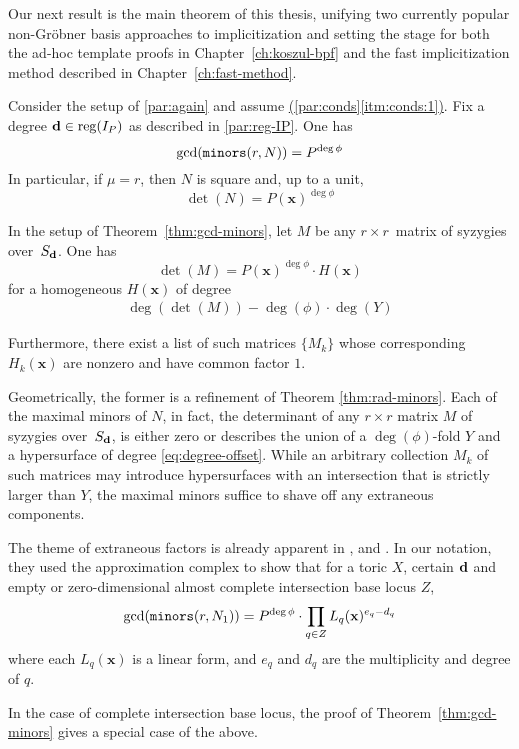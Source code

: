 \documentclass[fleqn,reqno]{amsart}
\renewcommand{\itmref}[2]{{\normalfont\hyperref[#1]{(\ref*{#2}\ref*{#1})}}}
\begin{document}
\begin{paragraf*}
Our next result is the main theorem of this thesis, unifying two currently
popular non-Gr\"{o}bner basis approaches to implicitization and setting the stage for both
the ad-hoc template proofs in Chapter~\ref{ch:koszul-bpf} and
the fast implicitization method described in Chapter~\ref{ch:fast-method}.
\end{paragraf*}

\begin{theorem}
\label{thm:gcd-minors}
Consider the setup of \eqref{par:again} and assume \itmref{itm:conds:1}{par:conds}.
Fix a degree $\mathbf d\in\operatorname{reg}(I_P)$ as described in \eqref{par:reg-IP}.
One has
\[
	\gcd(\mathop{\tt minors}(r, N))=P^{\deg\phi}
\]
In particular, if $\mu=r$, then $N$ is square and, up to a unit,
\[
	\det(N)=P(\mathbf x)^{\deg\phi}
\]
\end{theorem}

\begin{corollary}
\label{thm:detM}
In the setup of Theorem~\ref{thm:gcd-minors},
let $M$ be any $r\times r$~matrix of syzygies over~$S_\mathbf d$. One has
\[
	\det(M)=P(\mathbf x)^{\deg\phi}\cdot H(\mathbf x)
\]
for a homogeneous $H(\mathbf x)$ of degree
\begin{align}
\label{eq:degree-offset}
\deg(\det(M))-\deg(\phi)\cdot\deg(Y)
\end{align}

Furthermore, there exist a list of such matrices $\{M_k\}$ whose
corresponding $H_k(\mathbf x)$ are nonzero and have common factor $1$.
\end{corollary}

\begin{paragraf*}
Geometrically, the former is a refinement of Theorem \ref{thm:rad-minors}.
Each of the maximal minors of $N$, in fact,
the determinant of any $r\times r$ matrix $M$ of syzygies over~$S_\mathbf d$, is either zero
or describes the union of a $\deg(\phi)$-fold $Y$ and
a hypersurface of degree \eqref{eq:degree-offset}.
While an arbitrary collection $M_k$ of such matrices may introduce hypersurfaces
with an intersection that is strictly larger than $Y$,
the maximal minors suffice to shave off any extraneous components.

The theme of extraneous factors is already apparent in
\citet{BCD-03}, \citet{BCJ-09} and \citet{BDD-09}.
In our notation, they used the approximation complex to show that for a toric $X$,
certain $\mathbf d$ and empty or zero-dimensional almost complete intersection base locus $Z$,
\[
	\gcd(\mathop{\tt minors}(r,N_1))=P^{\deg\phi}\cdot\prod_{q\in Z} L_q(\mathbf x)^{e_q-d_q}
\]
where each $L_q(\mathbf x)$ is a linear form, and
$e_q$ and $d_q$ are the multiplicity and degree of $q$.

In the case of complete intersection base locus, the proof of Theorem~\ref{thm:gcd-minors}
gives a special case of the above.
\end{paragraf*}
\end{document}
